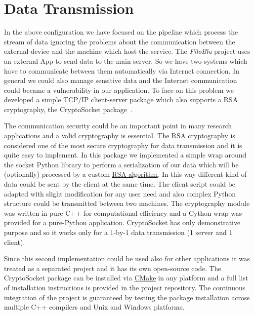 \documentclass{standalone}
\begin{document}
\section*{Data Transmission}

In the above configuration we have focused on the pipeline which process the stream of data ignoring the problems about the communication between the external device and the machine which host the service.
The \emph{FiloBlu} project uses an external App to send data to the main server.
So we have two systems which have to communicate between them automatically via Internet connection.
In general we could also manage sensitive data and the Internet communication could became a vulnerability in our application.
To face on this problem we developed a simple TCP/IP client-server package which also supports a RSA cryptography, the \textsf{CryptoSocket} package~\cite{CryptoSocket}.

The communication security could be an important point in many research applications and a valid cryptography is essential.
The RSA cryptography is considered one of the most secure cryptography for data transmission and it is quite easy to implement.
In this package we implemented a simple wrap around the \textsf{socket} Python library to perform a serialization of our data which will be (optionally) processed by a custom \href{https://en.wikipedia.org/wiki/RSA_(cryptosystem)}{RSA algorithm}.
In this way different kind of data could be sent by the client at the same time.
The client script could be adapted with slight modification for any user need and also complex Python structure could be transmitted between two machines.
The cryptography module was written in pure \textsf{C++} for computational efficiency and a \textsf{Cython} wrap was provided for a pure-Python application.
\textsf{CryptoSocket} has only demonstrative purpose and so it works only for a 1-by-1 data transmission (1 server and 1 client).

Since this second implementation could be used also for other applications it was treated as a separated project and it has its own open-source code.
The \textsf{CryptoSocket} package can be installed via \href{https://github.com/Nico-Curti/CryptoSocket/blob/master/CMakeLists.txt}{\textsf{CMake}} in any platform and a full list of installation instructions is provided in the project repository.
The continuous integration of the project is guaranteed by testing the package installation across multiple \textsf{C++} compilers and Unix and Windows platforms.
\end{document}
